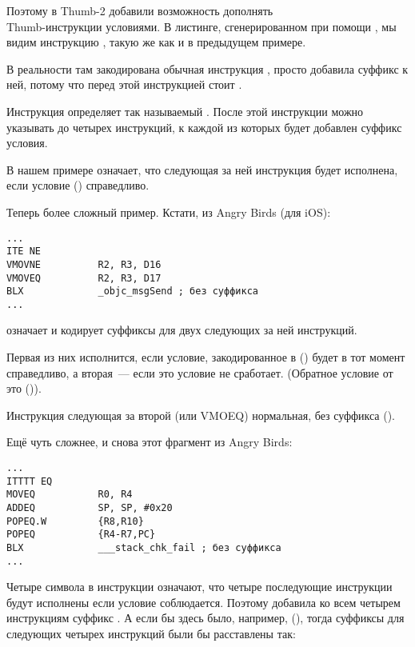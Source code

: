 Поэтому в Thumb-2 добавили возможность дополнять \\
Thumb-инструкции условиями.
В листинге, сгенерированном при помощи \IDA, мы видим инструкцию , 
такую же как и в предыдущем примере.

В реальности там закодирована обычная инструкция , просто \IDA добавила суффикс  к ней, 
потому что перед этой инструкцией стоит .

\label{ARM_Thumb_IT}
Инструкция  определяет так называемый . 
После этой инструкции можно указывать до четырех инструкций, 
к каждой из которых будет добавлен суффикс условия.

В нашем примере  означает,
что следующая за ней инструкция будет исполнена, если условие
 () справедливо.

Теперь более сложный пример. Кстати, из 
Angry Birds (для iOS):

\begin{lstlisting}[caption=Angry Birds Classic]
...
ITE NE
VMOVNE          R2, R3, D16
VMOVEQ          R2, R3, D17
BLX             _objc_msgSend ; без суффикса
...
\end{lstlisting}

 означает  
и кодирует суффиксы для двух следующих за ней инструкций.

Первая из них исполнится, если условие, закодированное в  () будет в тот момент справедливо,
а вторая~--- если это условие не сработает.
(Обратное условие от  это  ()).

Инструкция следующая за второй  (или VMOEQ) нормальная, без суффикса ().

Ещё чуть сложнее, и снова этот фрагмент из Angry Birds:

\begin{lstlisting}[caption=Angry Birds Classic]
...
ITTTT EQ
MOVEQ           R0, R4
ADDEQ           SP, SP, #0x20
POPEQ.W         {R8,R10}
POPEQ           {R4-R7,PC}
BLX             ___stack_chk_fail ; без суффикса
...
\end{lstlisting}

Четыре символа  в инструкции означают, что четыре последующие инструкции будут исполнены если условие соблюдается.
Поэтому \IDA добавила ко всем четырем инструкциям суффикс . 
А если бы здесь было, например,
 (), 
тогда суффиксы для следующих четырех инструкций были бы расставлены так:

